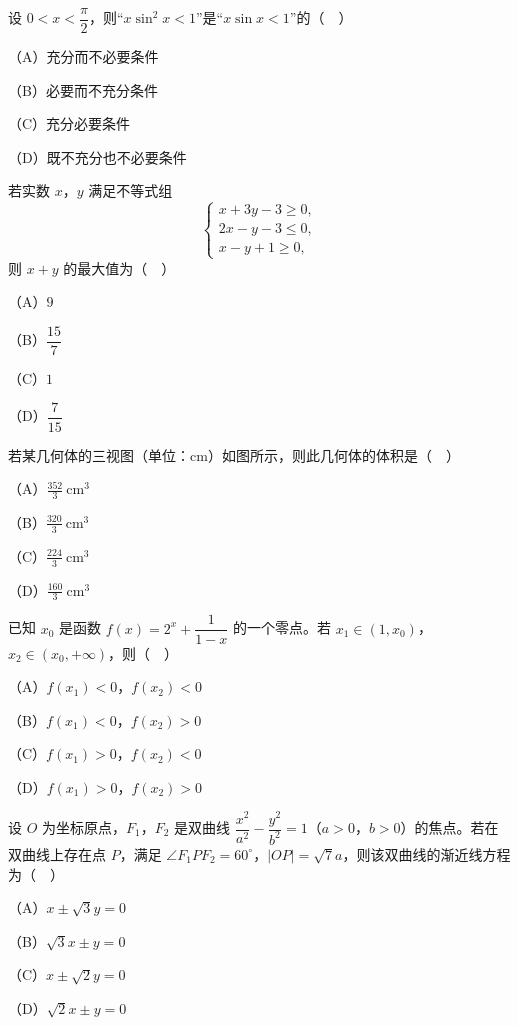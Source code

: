 \begin{question}
设 $0<x<\dfrac{\pi}{2}$，则“$x\sin^2x<1$”是“$x\sin x<1$”的（　）

（A）充分而不必要条件

（B）必要而不充分条件

（C）充分必要条件

（D）既不充分也不必要条件

\end{question}
\begingroup
\renewenvironment{question}{\Needspace{0.4\textheight}}{}
\begin{question}
若实数 $x$，$y$ 满足不等式组
\nopagebreak[4]
\[\begin{cases}
x+3y-3\geqslant 0,\\
2x-y-3\leqslant 0,\\
x-y+1\geqslant 0,
\end{cases}\]
则 $x+y$ 的最大值为（　）

（A）$9$

（B）$\dfrac{15}{7}$

（C）$1$

（D）$\dfrac{7}{15}$

\Needspace{0.4\textheight}
\end{question}
\endgroup
\begingroup
\renewenvironment{question}{\Needspace{0.5\textheight}}{}
\begin{question}
若某几何体的三视图（单位：cm）如图所示，则此几何体的体积是（　）

（A）$\frac{352}{3}\ \mathrm{cm}^3$

（B）$\frac{320}{3}\ \mathrm{cm}^3$

（C）$\frac{224}{3}\ \mathrm{cm}^3$

（D）$\frac{160}{3}\ \mathrm{cm}^3$
\nopagebreak[4]
\begin{center}\end{center}
\nopagebreak[4]
\end{question}
\endgroup
\begin{question}
已知 $x_0$ 是函数 $f(x)=2^x+\dfrac{1}{1-x}$ 的一个零点。若 $x_1\in(1,x_0)$，$x_2\in(x_0,+\infty)$，则（　）

（A）$f(x_1)<0$，$f(x_2)<0$

（B）$f(x_1)<0$，$f(x_2)>0$

（C）$f(x_1)>0$，$f(x_2)<0$

（D）$f(x_1)>0$，$f(x_2)>0$

\end{question}
\begin{question}
设 $O$ 为坐标原点，$F_1$，$F_2$ 是双曲线 $\dfrac{x^2}{a^2}-\dfrac{y^2}{b^2}=1$（$a>0$，$b>0$）的焦点。若在双曲线上存在点 $P$，满足 $\angle F_1PF_2=60^\circ$，$|OP|=\sqrt7a$，则该双曲线的渐近线方程为（　）

（A）$x\pm\sqrt3y=0$

（B）$\sqrt3x\pm y=0$

（C）$x\pm\sqrt2y=0$

（D）$\sqrt2x\pm y=0$

\end{question}
